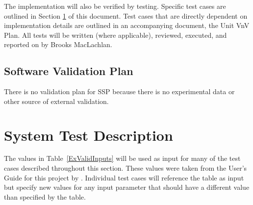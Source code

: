 \documentclass[12pt, titlepage]{article}
\newcommand{\progname}{SSP}
\begin{document}
\noindent The implementation will also be verified by testing. Specific test 
cases are outlined in Section \ref{sec_System} of this document. Test cases 
that are directly dependent on implementation details are outlined in an 
accompanying document, the Unit VnV Plan. All tests will be written (where 
applicable), reviewed, executed, and reported on by Brooks MacLachlan.

\subsection{Software Validation Plan}

There is no validation plan for \progname{} because there is no experimental 
data or other source of external validation.

\section{System Test Description} \label{sec_System}

The values in Table~\ref{ExValidInputs} will be used as input for 
many of the test cases described throughout this section. These values were 
taken from the User's Guide for this project by \cite{UserGuide}. Individual 
test cases will reference the table as input but specify new values for any 
input parameter that should have a different value than specified by the table.
\end{document}

